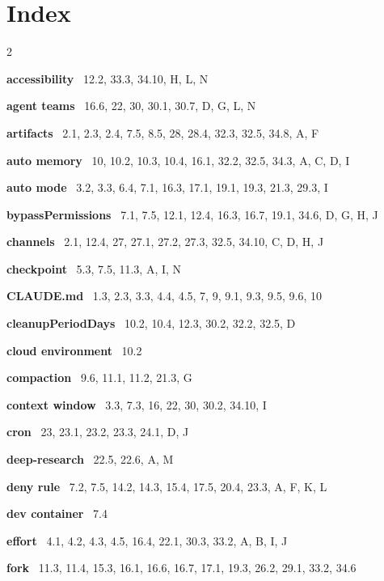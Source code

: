 \documentclass[11pt,a4paper,twoside,openany]{book}
\newenvironment{deflist}{%
  \begin{list}{}{%
    \setlength{\leftmargin}{6mm}\setlength{\itemindent}{-6mm}%
    \setlength{\listparindent}{0pt}\setlength{\labelwidth}{0pt}%
    \setlength{\labelsep}{0pt}\setlength{\topsep}{2mm}%
    \setlength{\itemsep}{0.9mm}\setlength{\parsep}{0pt}}}%
  {\end{list}}
\begin{document}
\FloatBarrier
\section*{Index}

\begin{multicols}{2}\footnotesize
\begin{deflist}
\item \textbf{accessibility} \textemdash\ 12.2, 33.3, 34.10, H, L, N  
\item \textbf{agent teams} \textemdash\ 16.6, 22, 30, 30.1, 30.7, D, G, L, N  
\item \textbf{artifacts} \textemdash\ 2.1, 2.3, 2.4, 7.5, 8.5, 28, 28.4, 32.3, 32.5, 34.8, A, F  
\item \textbf{auto memory} \textemdash\ 10, 10.2, 10.3, 10.4, 16.1, 32.2, 32.5, 34.3, A, C, D, I  
\item \textbf{auto mode} \textemdash\ 3.2, 3.3, 6.4, 7.1, 16.3, 17.1, 19.1, 19.3, 21.3, 29.3, I  
\item \textbf{bypassPermissions} \textemdash\ 7.1, 7.5, 12.1, 12.4, 16.3, 16.7, 19.1, 34.6, D, G, H, J  
\item \textbf{channels} \textemdash\ 2.1, 12.4, 27, 27.1, 27.2, 27.3, 32.5, 34.10, C, D, H, J  
\item \textbf{checkpoint} \textemdash\ 5.3, 7.5, 11.3, A, I, N  
\item \textbf{CLAUDE.md} \textemdash\ 1.3, 2.3, 3.3, 4.4, 4.5, 7, 9, 9.1, 9.3, 9.5, 9.6, 10  
\item \textbf{cleanupPeriodDays} \textemdash\ 10.2, 10.4, 12.3, 30.2, 32.2, 32.5, D  
\item \textbf{cloud environment} \textemdash\ 10.2  
\item \textbf{compaction} \textemdash\ 9.6, 11.1, 11.2, 21.3, G  
\item \textbf{context window} \textemdash\ 3.3, 7.3, 16, 22, 30, 30.2, 34.10, I  
\item \textbf{cron} \textemdash\ 23, 23.1, 23.2, 23.3, 24.1, D, J  
\item \textbf{deep-research} \textemdash\ 22.5, 22.6, A, M  
\item \textbf{deny rule} \textemdash\ 7.2, 7.5, 14.2, 14.3, 15.4, 17.5, 20.4, 23.3, A, F, K, L  
\item \textbf{dev container} \textemdash\ 7.4  
\item \textbf{effort} \textemdash\ 4.1, 4.2, 4.3, 4.5, 16.4, 22.1, 30.3, 33.2, A, B, I, J  
\item \textbf{fork} \textemdash\ 11.3, 11.4, 15.3, 16.1, 16.6, 16.7, 17.1, 19.3, 26.2, 29.1, 33.2, 34.6  

\end{deflist}
\end{multicols}
\end{document}
